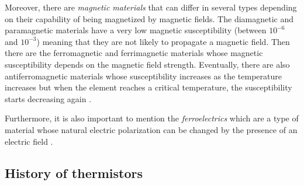 Moreover, there are \textsl{magnetic materials} that can differ in several types depending on their capability of being magnetized by magnetic fields. The diamagnetic and paramagnetic materials have a very low magnetic susceptibility (between $10^{-6}$ and $10^{-3}$) meaning that they are not likely to propagate a magnetic field. Then there are the ferromagnetic and ferrimagnetic materials whose magnetic susceptibility depends on the magnetic field strength. Eventually, there are also antiferromagnetic materials whose susceptibility increases as the temperature increases but when the element reaches a critical temperature, the susceptibility starts decreasing again \cite{Gupta20163}\cite{heck2013magnetic}.

Furthermore, it is also important to mention the \textsl{ferroelectrics} which are a type of material whose natural electric polarization can be changed by the presence of an electric field \cite{Gupta20163}\cite{whatmore2017ferroelectric}.

\subsection{History of thermistors}
